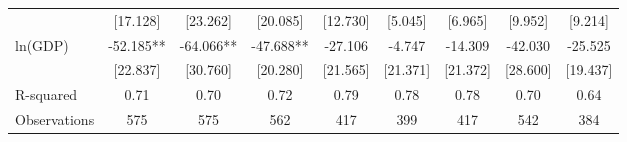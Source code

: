 \begin{table}[htbp]
{\begin{tabular}{l*{8}{c}}
                    &    [17.128]   &    [23.262]   &    [20.085]   &    [12.730]   &     [5.045]   &     [6.965]   &     [9.952]   &     [9.214]   \\
ln(GDP)             &     -52.185** &     -64.066** &     -47.688** &     -27.106   &      -4.747   &     -14.309   &     -42.030   &     -25.525   \\
                    &    [22.837]   &    [30.760]   &    [20.280]   &    [21.565]   &    [21.371]   &    [21.372]   &    [28.600]   &    [19.437]   \\
\midrule
R-squared           &        0.71   &        0.70   &        0.72   &        0.79   &        0.78   &        0.78   &        0.70   &        0.64   \\
Observations        &         575   &         575   &         562   &         417   &         399   &         417   &         542   &         384   \\
\bottomrule\end{tabular}}\end{table}
